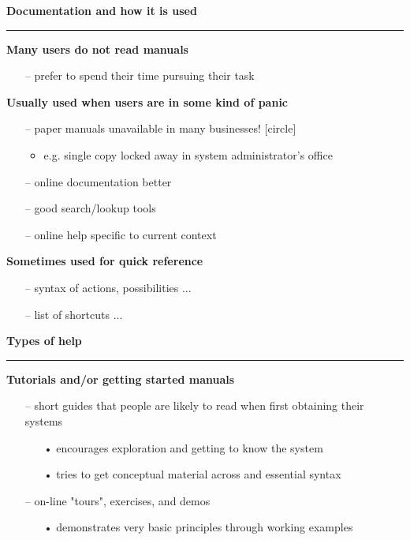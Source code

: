 \documentclass[pdf]{beamer}
\begin{document}
\begin{frame}
{\textbf{Documentation and how it is used}}{\textcolor{red}{\rule{12cm}{1.2pt}}}

 	\medskip
 
    \textbf{Many users do not read manuals}
    \begin{itemize}
		\item[--] {prefer to spend their time pursuing their task}
    \end{itemize}
    \medskip
   	\textbf{Usually used when users are in some kind of panic}
    \begin{itemize}
        \item[--] {paper manuals unavailable in many businesses!} 
        [circle]
		\begin{itemize}
      		\item {e.g. single copy locked away in system administrator’s office}
		\end{itemize}
        \item[--] {online documentation better}
        \item[--] {good search/lookup tools}
        \item[--] {online help specific to current context}
    \end{itemize}
    \medskip
    \textbf{Sometimes used for quick reference}
    \begin{itemize}
        \item[--] {syntax of actions, possibilities ...} 
        \item[--] {list of shortcuts ...}
    \end{itemize}
    
\end{frame}



\begin{frame}
{\textbf{Types of help}}{\textcolor{red}{\rule{12cm}{1.2pt}}}
	
 	\bigskip
  	
	\textbf{Tutorials and/or getting started manuals}
	\begin{itemize}
        \item[--] {short guides that people are likely to read when first obtaining their systems}
		\begin{itemize}
			\item[{•}] {encourages exploration and getting to know the system}
			\item[{•}] {tries to get conceptual material across and essential syntax}
		\end{itemize}
	\medskip
	\item[--] {on-line "tours", exercises, and demos}
	\begin{itemize}
		\item[{•}] {demonstrates very basic principles through working examples}
        \end{itemize}
    \end{itemize}
\end{frame}
\end{document}
